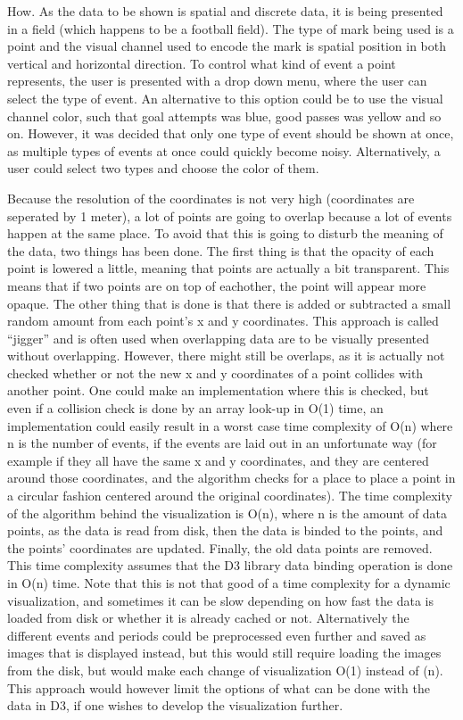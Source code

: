 \documentclass[Report.tex]{subfiles}
\begin{document}
\noindent How. As the data to be shown is spatial and discrete data, it is being presented in a field (which happens to be a football field). The type of mark being used is a point and the visual channel used to encode the mark is spatial position in both vertical and horizontal direction. To control what kind of event a point represents, the user is presented with a drop down menu, where the user can select the type of event. An alternative to this option could be to use the visual channel color, such that goal attempts was blue, good passes was yellow and so on. However, it was decided that only one type of event should be shown at once, as multiple types of events at once could quickly become noisy. Alternatively, a user could select two types and choose the color of them.

Because the resolution of the coordinates is not very high (coordinates are seperated by 1 meter), a lot of points are going to overlap because a lot of events happen at the same place. To avoid that this is going to disturb the meaning of the data, two things has been done. The first thing is that the opacity of each point is lowered a little, meaning that points are actually a bit transparent. This means that if two points are on top of eachother, the point will appear more opaque. The other thing that is done is that there is added or subtracted a small random amount from each point's x and y coordinates. This approach is called ``jigger'' and is often used when overlapping data are to be visually presented without overlapping. However, there might still be overlaps, as it is actually not checked whether or not the new x and y coordinates of a point collides with another point. One could make an implementation where this is checked, but even if a collision check is done by an array look-up in O(1) time, an implementation could easily result in a worst case time complexity of O(n) where n is the number of events, if the events are laid out in an unfortunate way (for example if they all have the same x and y coordinates, and they are centered around those coordinates, and the algorithm checks for a place to place a point in a circular fashion centered around the original coordinates). The time complexity of the algorithm behind the visualization is O(n), where n is the amount of data points, as the data is read from disk, then the data is binded to the points, and the points' coordinates are updated. Finally, the old data points are removed. This time complexity assumes that the D3 library data binding operation is done in O(n) time. Note that this is not that good of a time complexity for a dynamic visualization, and sometimes it can be slow depending on how fast the data is loaded from disk or whether it is already cached or not. Alternatively the different events and periods could be preprocessed even further and saved as images that is displayed instead, but this would still require loading the images from the disk, but would make each change of visualization O(1) instead of (n). This approach would however limit the options of what can be done with the data in D3, if one wishes to develop the visualization further.
\end{document}

